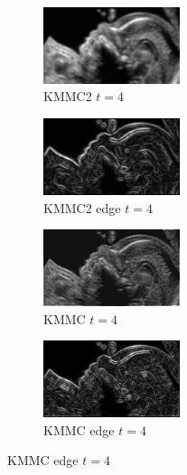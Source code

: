 \documentclass[a4paper,10pt,twocolumn]{article}
\begin{document}
\begin{center}
\begin{figure}[!htb]
		
		\begin{subfigure}[d!]{4cm}
			\includegraphics[width=4cm]{image/im7/im_7_4}
			\caption{KMMC2 $t = 4$}
		\end{subfigure}
		\begin{subfigure}[e!]{4cm}
			\includegraphics[width=4cm]{image/im7/im_7_4_edge}
			\caption{KMMC2 edge $t = 4$}
		\end{subfigure}
		\begin{subfigure}[f!]{4cm}
			\includegraphics[width=4cm]{image/im7/im_7_4_norm}
			\caption{KMMC $t = 4$}
		\end{subfigure}
		\begin{subfigure}[g!]{4cm}
			\includegraphics[width=4cm]{image/im7/im_7_4_norm_edge}
			\caption{KMMC edge $t = 4$}
		\end{subfigure}
		

\end{figure}
\end{center}
\end{document}
